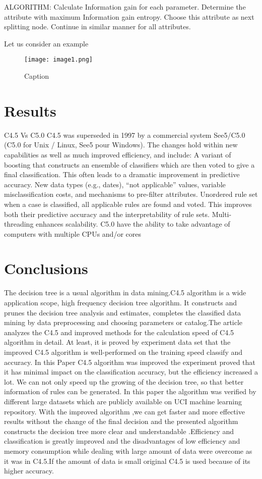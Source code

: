 \documentclass[aps,floatfix,prd,showpacs]{revtex4}
\begin{document}
ALGORITHM:
Calculate Information gain for each parameter.
Determine the attribute with maximum Information gain entropy.
Choose this attribute as next splitting node.
Continue in similar manner for all attributes.
 
Let us consider an example 

\begin{figure}
    \centering
    \texttt{[image: image1.png]}
    \caption{Caption}
    \label{fig:my_label}
\end{figure}

\section{Results}
C4.5 Vs C5.0 C4.5 was superseded in 1997 by a commercial system See5/C5.0 (C5.0 for Unix / Linux, See5 pour Windows).  
The changes hold within new capabilities as well as much improved efficiency, and include: 
  A variant of boosting that constructs an ensemble of classifiers which are then voted to give a final classification. This often leads to a dramatic improvement in predictive accuracy.   New data types (e.g., dates), “not applicable” values, variable misclassification costs, and mechanisms to pre-filter attributes. 
 Unordered rule set when a case is classified, all applicable rules are found and voted. 
 This improves both their predictive accuracy and the interpretability of rule sets.  
Multi-threading enhances scalability. C5.0 have the ability to take advantage of computers with multiple CPUs and/or cores


\section{Conclusions}

The decision tree is a usual algorithm in data mining.C4.5 algorithm is a wide application scope, high frequency decision tree algorithm. It constructs and prunes the decision tree analysis and estimates, completes the classified data mining by data preprocessing and choosing parameters or catalog.The article analyzes the C4.5 and improved methods for the calculation speed of C4.5 algorithm in detail. At least, it is proved by experiment data set that the improved C4.5 algorithm is well-performed on the training speed classify and accuracy. In this Paper C4.5 algorithm was improved the experiment proved that it has minimal impact on the classification accuracy, but the efficiency increased a lot. We can not only speed up the growing of the decision tree, so that better information of rules can be generated. In this paper the algorithm was verified by different large datasets which are publicly available on UCI
machine learning repository. With the improved algorithm ,we can get faster and more effective results without the change of the final decision and the presented algorithm constructs the decision tree more clear and understandable .Efficiency and classification is greatly improved and the disadvantages of low efficiency and memory consumption while dealing with large amount of data were overcome as it was in C4.5.If the amount of data is small original C4.5 is
used because of its higher accuracy.
\end{document}
